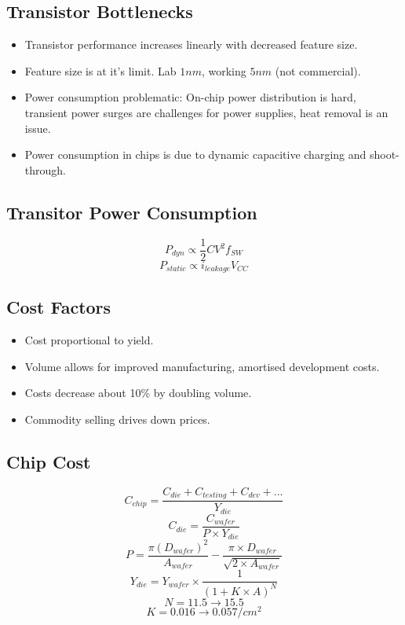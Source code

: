 \documentclass[8pt]{extarticle}
\begin{document}
\begin{multicols}{3}
\subsection{Transistor Bottlenecks}
\begin{itemize}
  \item Transistor performance increases linearly with decreased feature size.
  \item Feature size is at it's limit. Lab \(1nm\), working
    \(5nm\) (not commercial).
  \item Power consumption problematic: On-chip power distribution is hard,
    transient power surges are challenges for power supplies, heat removal is
    an issue.
  \item Power consumption in chips is due to dynamic capacitive charging and
    shoot-through.
\end{itemize}

\subsection{Transitor Power Consumption}
\[  P_{dyn} \propto \frac{1}{2} C V^{2} f_{SW} \]
\[ P_{static} \propto i_{leakage} V_{CC} \]

\subsection{Cost Factors}
\begin{itemize}
  \item Cost proportional to yield.
  \item Volume allows for improved manufacturing, amortised development costs.
  \item Costs decrease about 10\% by doubling volume.
  \item Commodity selling drives down prices.
\end{itemize}

\subsection {Chip Cost}

\[ C_{chip} = \frac{C_{die} + C_{testing} + C_{dev} + ...}{Y_{die}} \]
\[ C_{die} = \frac{C_{wafer}}{P \times Y_{die}} \]
\[ P = \frac{\pi (D_{wafer})^{2}}{A_{wafer}} -
  \frac{\pi \times D_{wafer}}{\sqrt{2 \times A_{wafer}}} \]
\[ Y_{die} = Y_{wafer} \times \frac{1}{(1 + K \times A)^{N}} \]
\[ N = 11.5 \rightarrow 15.5 \]
\[ K = 0.016 \rightarrow 0.057 / cm^2 \]


\end{multicols}
\end{document}
